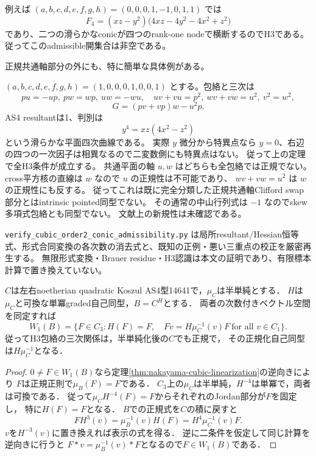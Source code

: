 例えば $(a,b,c,d,e,f,g,h)=(0,0,0,1,-1,0,1,1)$ では
\[
 F_4=(xz-y^2)\bigl(4xz-4y^2-4x^2+z^2\bigr)
\]
であり、二つの滑らかなconicが四つのrank-one nodeで横断するのでH3である。
従ってこのadmissible開集合は非空である。

正規共通軸部分の外にも、特に簡単な具体例がある。
\begin{example}
\label{ex:h3-order2-nonnormal-axis}
$(a,b,c,d,e,f,g,h)=(1,0,0,0,1,0,0,1)$ とする。包絡と三次は
\[
 pu=-up,\ pw=wp,\ uw=-wu,\quad
 uv+vu=p^2,\ wv+vw=u^2,\ v^2=w^2,
\]
\[
 G=(pv+vp)w-u^2p.
\]
AS4 resultantは1、判別は
\[
 y^4=xz(4x^2-z^2)
\]
という滑らかな平面四次曲線である。
実際 $y$ 微分から特異点なら $y=0$、右辺の四つの一次因子は相異なるので二変数側にも特異点はない。
従って上の定理で全H3条件が成立する。
共通平面の軸 $u,w$ はどちらも全包絡では正規でない。
cross平方核の直線は $w$ なので $u$ の正規性は不可能であり、
$wv+vw=u^2$ は $w$ の正規性にも反する。
従ってこれは既に完全分類した正規共通軸Clifford swap部分とはintrinsic pointed同型でない。
その通常の中山行列式は $-1$ なのでskew多項式包絡とも同型でない。
文献上の新規性は未確認である。
\end{example}
\texttt{verify\_\allowbreak{}cubic\_\allowbreak{}order2\_\allowbreak{}conic\_\allowbreak{}admissibility.py}
は局所resultant/Hessian恒等式、形式合同変換の各次数の消去式と、既知の正例・悪い三重点の校正を厳密再生する。
無限形式変換・Brauer residue・H3認識は本文の証明であり、有限標本計算で置き換えていない。

\begin{lemma}[単冪twist下の反標準三次関係の輸送]
\label{lem:h3-unipotent-transport}
$C$は左右noetherian quadratic Koszul AS4型14641で，$\mu_C$は半単純とする．
$H$は$\mu_C$と可換な単冪graded自己同型，$B=C^H$とする．
両者の次数付きベクトル空間を同定すれば
\[
 W_1(B)=\{F\in C_3:H(F)=F,\quad
                 Fv=H\mu_C^{-1}(v)F\ \text{for all }v\in C_1\}.
\]
従ってH3包絡の三次関係は，半単純化後の$C$でも正規で，
その正規化自己同型は$H\mu_C^{-1}$となる．
\end{lemma}
\begin{proof}
$0\ne F\in W_1(B)$なら定理\ref{thm:nakayama-cubic-linearization}の逆向きにより
$F$は正規正則で$\mu_B(F)=F$である．
$C_3$上の$\mu_C$は半単純，$H^{-4}$は単冪で，両者は可換である．
従って$\mu_CH^{-4}(F)=F$からそれぞれのJordan部分が$F$を固定し，
特に$H(F)=F$となる．
$B$での正規式を$C$の積に戻すと
\[
 F H^3(v)=\mu_B^{-1}(v)H(F)=H^4\mu_C^{-1}(v)F.
\]
$v$を$H^{-3}(v)$に置き換えれば表示の式を得る．
逆に二条件を仮定して同じ計算を逆向きに行うと
$F*v=\mu_B^{-1}(v)*F$となるので$F\in W_1(B)$である．
\end{proof}

